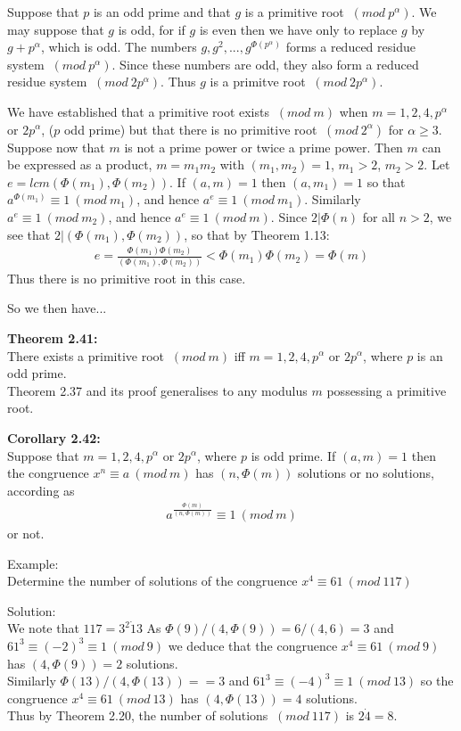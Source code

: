 \documentclass[a4paper]{article}
\begin{document}
Suppose that $p$ is an odd prime and that $g$ is a primitive root $\ (mod\ p^{\alpha})$. We may suppose that $g$ is odd, for if $g$ is even then we have only to replace $g$ by $g+p^{\alpha}$, which is odd. The numbers $g,g^2,...,g^{\Phi(p^{\alpha})}$ forms a reduced residue system $\ (mod\ p^{\alpha})$. Since these numbers are odd, they also form a reduced residue system $\ (mod\ 2p^{\alpha})$. Thus $g$ is a primitve root $\ (mod\ 2p^{\alpha})$.

We have established that a primitive root exists $\ (mod\ m)$ when $m=1,2,4,p^{\alpha}$ or $2p^{\alpha}$, ($p$ odd prime) but that there is no primitive root $\ (mod\ 2^{\alpha})$ for $\alpha\geq 3$. Suppose now that $m$ is not a prime power or twice a prime power. Then $m$ can be expressed as a product, $m=m_1m_2$ with $(m_1,m_2)=1$, $m_1>2$, $m_2>2$. Let $e=lcm(\Phi(m_1),\Phi(m_2))$. If $(a,m)=1$ then $(a,m_1)=1$ so that $a^{\Phi(m_1)} \equiv 1 \ (mod\ m_1)$, and hence $a^e \equiv 1 \ (mod\ m_1)$. Similarly $a^e \equiv 1 \ (mod\ m_2)$, and hence $a^e \equiv 1 \ (mod\ m)$.
Since $2|\Phi(n)$ for all $n>2$, we see that $2|(\Phi(m_1),\Phi(m_2))$, so that by Theorem 1.13:
\begin{align*}
    e = \frac{\Phi(m_1)\Phi(m_2)}{(\Phi(m_1),\Phi(m_2))} < \Phi(m_1)\Phi(m_2) = \Phi(m)
\end{align*}
Thus there is no primitive root in this case.

So we then have...

\textbf{Theorem 2.41:}\\
There exists a primitive root $\ (mod\ m)$ iff $m=1,2,4,p^{\alpha}$ or $2p^{\alpha}$, where $p$ is an odd prime.\\
Theorem 2.37 and its proof generalises to any modulus $m$ possessing a primitive root.

\textbf{Corollary 2.42:}\\
Suppose that $m=1,2,4,p^{\alpha}$ or $2p^{\alpha}$, where $p$ is odd prime. If $(a,m)=1$ then the congruence $x^n \equiv a \ (mod\ m)$ has $(n,\Phi(m))$ solutions or no solutions, according as
\begin{align*}
    a^{\frac{\Phi(m)}{(n,\Phi(m))}} \equiv 1 \ (mod\ m)
\end{align*}
or not.

Example:\\
Determine the number of solutions of the congruence $x^4 \equiv 61 \ (mod\ 117)$

Solution:\\
We note that $117 = 3^2\dot 13$
As $\Phi(9)/(4,\Phi(9))=6/(4,6)=3$ and $61^3 \equiv (-2)^3 \equiv 1 \ (mod\ 9)$ we deduce that the congruence $x^4 \equiv 61 \ (mod\ 9)$ has $(4,\Phi(9))=2$ solutions.\\
Similarly $\Phi(13)/(4,\Phi(13))==3$ and $61^3 \equiv (-4)^3 \equiv  1 \ (mod\ 13)$ so the congruence $x^4 \equiv 61 \ (mod\ 13)$ has $(4,\Phi(13))=4$ solutions.\\
Thus by Theorem 2.20, the number of solutions $\ (mod\ 117)$ is $2\dot4 = 8$.
\end{document}
